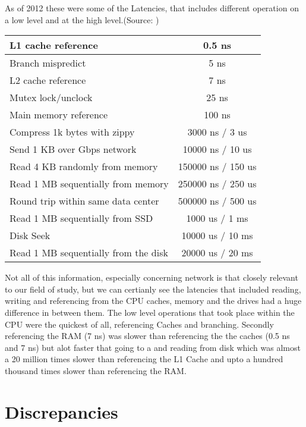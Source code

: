\documentclass[12pt]{article}
\begin{document}
As of 2012 these were some of the Latencies, that includes different operation on a low level
and at the high level.(Source: \cite {Latencies})

\begin{tabular}{|l|c|}
  \hline
  L1 cache reference & 0.5 ns\\
  \hline
  Branch mispredict & 5 ns\\
  \hline
  L2 cache reference & 7 ns\\
  \hline
  Mutex lock/unclock & 25 ns\\
  \hline
  Main memory reference & 100 ns\\
  \hline
  Compress 1k bytes with zippy & 3000 ns / 3 us\\
  \hline
  Send 1 KB over Gbps network & 10000 ns / 10 us\\
  \hline
  Read 4 KB randomly from memory & 150000 ns / 150 us\\
  \hline
  Read 1 MB sequentially from memory & 250000 ns / 250 us\\
  \hline
  Round trip within same data center & 500000 ns / 500 us\\
  \hline
  Read 1 MB sequentially from SSD & 1000 us / 1 ms\\
  \hline
  Disk Seek & 10000 us / 10 ms\\
  \hline
  Read 1 MB sequentially from the disk & 20000 us / 20 ms\\ 
  \hline    
\end {tabular}

Not all of this information, especially concerning network is that closely relevant to our field of study, but
we can certianly see the latencies that included reading, writing and referencing from the CPU caches, memory
and the drives had a huge difference in between them. The low level operations that took place within the
CPU were the quickest of all, referencing Caches and branching. Secondly referencing the RAM (7 ns) was slower than
referencing the the caches (0.5 ns and 7 ns) but alot faster that going to a and reading from disk which was almost a
20 million times slower than referencing the L1 Cache and upto a hundred thousand times slower than referencing
the RAM. 

\section{Discrepancies}
\label{sec:disc}
\end{document}
